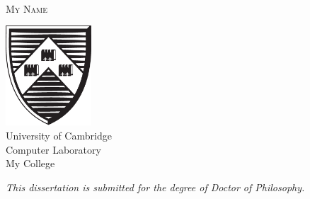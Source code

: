 
{
\pagestyle{empty}

\centering
\null\vfill


\fontsize{36.5}{34}\scshape{}
\\[2cm]%

\fontsize{24}{30}\normalfont
My Name\\[0.5cm]%

\fontsize{20}{30}\normalfont
\monthname\space\number\year

\vfill

\includegraphics[width=3.2cm]{Figures/Shield.eps}\\[0.6cm]

\fontsize{16}{20}\normalfont
University of Cambridge\\
Computer Laboratory\\[10pt]
My College

\vfill

\fontsize{13}{16}\itshape
This dissertation is submitted for the degree of Doctor of Philosophy.

\vfill\null

\restoregeometry
}